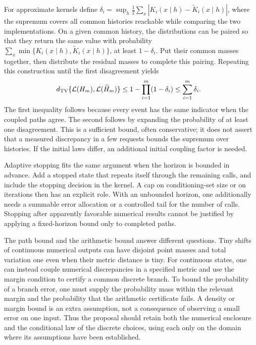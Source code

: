 For approximate kernels define
$\delta_i=\sup_h \frac12\sum_x|K_i(x\mid h)-\widetilde K_i(x\mid h)|$,
where the supremum covers all common histories reachable while comparing the
two implementations. On a given common history, the distributions can be
paired so that they return the same value with probability
$\sum_x\min\{K_i(x\mid h),\widetilde K_i(x\mid h)\}$, at least
$1-\delta_i$. Put their common masses together, then distribute the residual
masses to complete this pairing. Repeating this construction until the first
disagreement yields
\begin{equation}
 d_{\rm TV}\{\mathcal L(H_m),\mathcal L(\widetilde H_m)\}
 \leq 1-\prod_{i=1}^{m}(1-\delta_i)
 \leq\sum_{i=1}^{m}\delta_i.
 \label{exec17:s9-path-tv}
\end{equation}
The first inequality follows because every event has the same indicator when
the coupled paths agree. The second follows by expanding the probability of
at least one disagreement. This is a sufficient bound, often conservative;
it does not assert that a measured discrepancy in a few requests bounds the
supremum over histories. If the initial laws differ, an additional initial
coupling factor is needed.

Adaptive stopping fits the same argument when the horizon is bounded in
advance. Add a stopped state that repeats itself through the remaining calls,
and include the stopping decision in the kernel. A cap on conditioning-set
size or on iterations then has an explicit role. With an unbounded horizon,
one additionally needs a summable error allocation or a controlled tail for
the number of calls. Stopping after apparently favorable numerical results
cannot be justified by applying a fixed-horizon bound only to completed paths.

The path bound and the arithmetic bound answer different questions. Tiny
shifts of continuous numerical outputs can have disjoint point masses and
total variation one even when their metric distance is tiny. For continuous
states, one can instead couple numerical discrepancies in a specified metric
and use the margin condition to certify a common discrete branch. To bound
the probability of a branch error, one must supply the probability mass within
the relevant margin and the probability that the arithmetic certificate fails.
A density or margin bound is an extra assumption, not a consequence of
observing a small error on one input. Thus the proposal should retain both the
numerical enclosure and the conditional law of the discrete choices, using
each only on the domain where its assumptions have been established.

